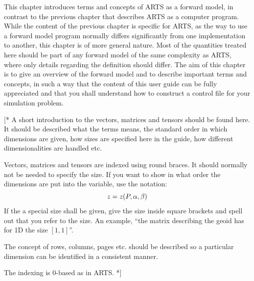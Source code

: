 This chapter introduces terms and concepts of ARTS as a forward model,
in contrast to the previous chapter that describes ARTS as a computer
program. While the content of the previous chapter is specific for
ARTS, as the way to use a forward model program normally differs
significantly from one implementation to another, this chapter is of
more general nature. Most of the quantities treated here should be
part of any forward model of the same complexity as ARTS, where only
details regarding the definition should differ. The aim of this
chapter is to give an overview of the forward model and to describe
important terms and concepts, in such a way that the content of this user
guide can be fully appreciated and that you shall understand how to
construct a control file for your simulation problem.



\label{sec:fm_defs:math}

[* A short introduction to the vectors, matrices and tensors should be
found here. It should be described what the terms means, the standard
order in which dimensions are given, how sizes are specified here in
the guide, how different dimensionalities are handled etc.

Vectors, matrices and tensors are indexed using round braces.
It should normally not be needed to specify the size. If you want to
show in what order the dimensions are put into the variable, use the
notation:
\begin{equation}
  z = z(P,\alpha,\beta)
\end{equation}
If the a special size shall be given, give the size inside square
brackets and spell out that you refer to the size. An example, 
``the matrix describing the geoid has for 1D the size $[1,1]$''.

The concept of rows, columns, pages etc. should be described so a
particular dimension can be identified in a consistent manner.

The indexing is 0-based as in ARTS. *]



\label{sec:fm_defs:atmosphere}


\label{sec:fm_defs:atmdim}

